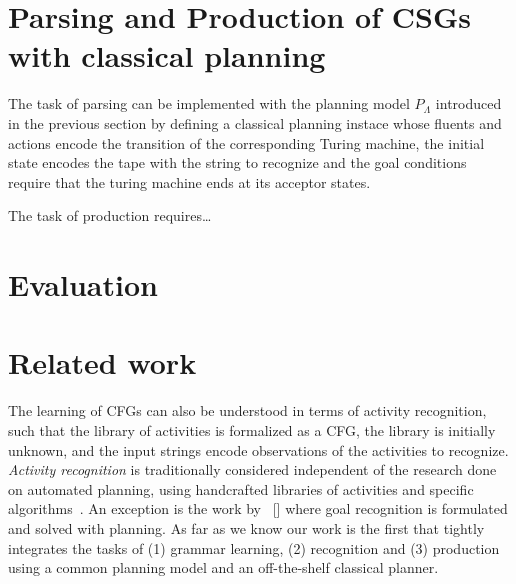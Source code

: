 \documentclass[letterpaper]{article} %
\begin{document}
\section{Parsing and Production of CSGs with classical planning}
The task of parsing can be implemented with the planning model $P_{\Lambda}$ introduced in the previous section by defining a classical planning instace whose fluents and actions encode the transition of the corresponding Turing machine, the initial state encodes the tape with the string to recognize and the goal conditions require that the turing machine ends at its acceptor states.

The task of production requires\ldots

\section{Evaluation}


\section{Related work}

The learning of CFGs can also be understood in terms of activity recognition, such that the library of activities is formalized as a CFG, the library is initially unknown, and the input strings encode observations of the activities to recognize. {\it Activity recognition} is traditionally considered independent of the research done on automated planning, using handcrafted libraries of activities and specific algorithms~\cite{ravi2005activity}. An exception is the work by \citeauthor{ramirez2009plan}~[\citeyear{ramirez2009plan,ramirez2010probabilistic}] where goal recognition is formulated and solved with planning. As far as we know our work is the first that tightly integrates the tasks of (1) grammar learning, (2) recognition and (3) production using a common planning model and an off-the-shelf classical planner. 
\end{document}
